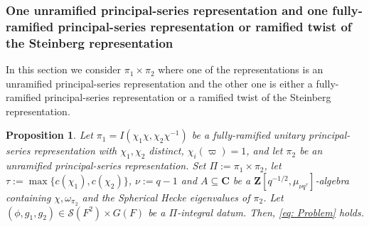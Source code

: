\documentclass{amsart}
\theoremstyle{plain}
\newtheorem{prop}[thm]{Proposition}
\theoremstyle{plain}
\theoremstyle{remark}
\begin{document}
\subsubsection{One unramified principal-series representation and one fully-ramified principal-series representation or ramified twist of the Steinberg representation}
In this section we consider $\pi_1\times\pi_2$ where one of the representations is an unramified principal-series representation and the other one is either a fully-ramified principal-series representation or a ramified twist of the Steinberg representation. 
\begin{prop}\label{thm unr p-s x fully ram p-s}
    Let $\pi_1=I(\chi_1\chi,\chi_2\chi^{-1})$ be a fully-ramified unitary principal-series representation with $\chi_1,\chi_2$ distinct, $\chi_i(\varpi)=1$, and let $\pi_2$ be an unramified principal-series representation. Set $\Pi:=\pi_1\times \pi_2$, let $\tau:=\max\{c(\chi_1),c(\chi_2)\}$, $\nu:=q-1$ and $A\subseteq\mathbf{C}$ be a $\mathbf{Z}[q^{-1/2},\mu_{\nu q^\tau}]$-algebra containing $\chi,\omega_{\pi_2}$ and the Spherical Hecke eigenvalues of $\pi_2$. Let $(\phi,g_1,g_2)\in\mathcal{S}(F^2)\times G(F)$ be a $\Pi$-integral datum. Then, \eqref{eq: Problem} holds.
\end{prop}
\end{document}
